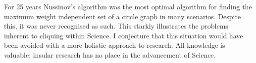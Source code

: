 \documentclass[12pt, a4paper]{article}
\begin{document}
For 25 years Nussinov's algorithm was the most optimal algorithm for finding the maximum weight independent set of a circle graph in many scenarios. Despite this, it was never recognised as such. This starkly illustrates the problems inherent to cliquing within Science. I conjecture that this situation would have been avoided with a more holistic approach to research. All knowledge is valuable; insular research has no place in the advancement of Science.




\end{document}
